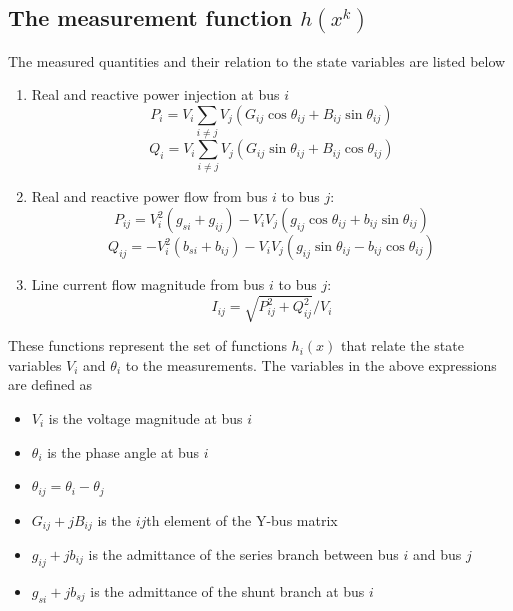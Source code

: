\documentclass[12pt]{article}
\begin{document}
\subsection*{The measurement function $h(x^k)$}

The measured quantities and their relation to the state variables are listed
below
\begin{enumerate}
\item Real and reactive power injection at bus $i$
\begin{equation}\label{eq:Pi}
P_i = V_i \sum_{i\ne j}V_j(G_{ij}\cos \theta _{ij}+B_{ij}\sin \theta _{ij})
\end{equation} 
\begin{equation}\label{eq:Qi}
Q_i = V_i \sum_{i\ne j}V_j(G_{ij}\sin \theta _{ij}+B_{ij}\cos \theta _{ij})
\end{equation} 
\item Real and reactive power flow from bus $i$ to bus $j$:
\begin{equation}\label{eq:Pij}
P_{ij} = V_i^2(g_{si}+g_{ij}) -V_iV_j(g_{ij}\cos \theta _{ij}+b_{ij}\sin \theta _{ij})
\end{equation}
\begin{equation}\label{eq:Qij}
Q_{ij} = -V_i^2(b_{si}+b_{ij}) -V_iV_j(g_{ij}\sin \theta _{ij}-b_{ij}\cos \theta _{ij})
\end{equation}
\item Line current flow magnitude from bus $i$ to bus $j$:
\begin{equation}\label{eq:Iij}
I_{ij} = \sqrt {P_{ij}^2+Q_{ij}^2}/V_i
\end{equation}
\end{enumerate}
These functions represent the set of functions $h_i(x)$ that relate the state
variables $V_i$ and $\theta_i$ to the measurements. The variables in the above
expressions are defined as

\begin{itemize}
\item $V_i$ is the voltage magnitude at bus $i$
\item $\theta_i$ is the phase angle at bus $i$
\item $\theta_{ij} = \theta_i-\theta_j$
\item $G_{ij}+jB_{ij}$ is the $ij$th element of the Y-bus matrix
\item $g_{ij}+jb_{ij}$ is the admittance of the series branch between bus $i$ and bus $j$
\item $g_{si}+jb_{sj}$ is the admittance of the shunt branch at bus $i$ 
\end{itemize}
\end{document}
